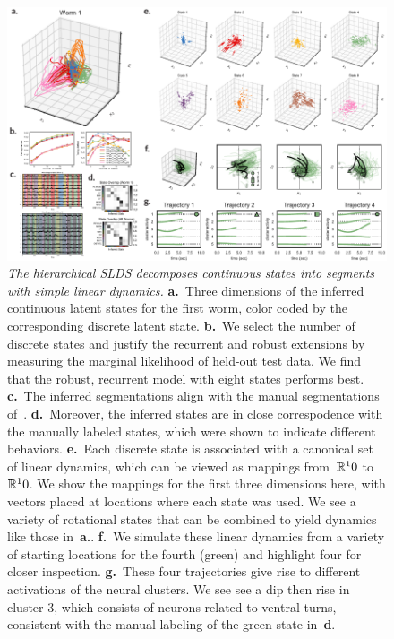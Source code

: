 \documentclass[11pt]{article}
\begin{document}
\begin{figure}[t!]
\centering
\includegraphics[width=6in]{figures/figure3} 
\caption{ \textit{The hierarchical SLDS decomposes continuous states
    into segments with simple linear dynamics.}
  \textbf{a.}~Three dimensions of the inferred continuous latent states
  for the first worm, color coded by the corresponding discrete latent
  state.
  \textbf{b.}~We select the number of discrete states and justify the
  recurrent and robust extensions by measuring the marginal likelihood
  of held-out test data. We find that the robust, recurrent model
  with eight states performs best.
  \textbf{c.}~The inferred segmentations align with the manual segmentations
  of~\citet{kato2015global}.
  \textbf{d.}~Moreover, the inferred states are in close correspodence with
  the manually labeled states, which were shown to indicate different behaviors.
  \textbf{e.}~Each discrete state is associated with a canonical set of linear
  dynamics, which can be viewed as mappings from~$\mathbb{R}^10$ to~$\mathbb{R}^10$.
  We show the mappings for the first three dimensions here, with vectors placed
  at locations where each state was used.  We see a variety of rotational
  states that can be combined to yield dynamics like those in~\textbf{a.}.
  \textbf{f.}~We simulate these linear dynamics from a variety of starting
  locations for the fourth (green) and highlight four for closer inspection.
  \textbf{g.}~These four trajectories give rise to different activations of
  the neural clusters. We see see a dip then rise in cluster 3, which consists
  of neurons related to ventral turns, consistent with the manual labeling
  of the green state in~\textbf{d}.
}
\label{fig:syllables}
\end{figure}
\end{document}
